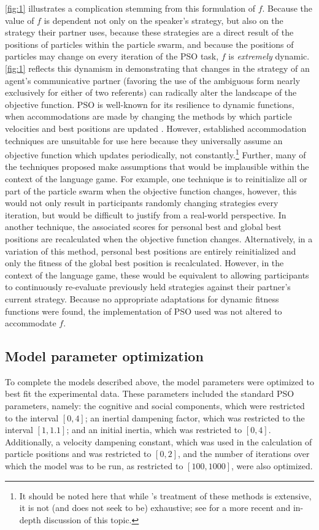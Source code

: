 \documentclass[12pt,a4paper]{article}
\begin{document}
\autoref{fig:1} illustrates a complication stemming from this formulation of $f$. Because the value of $f$ is dependent not only on the speaker's strategy, but also on the strategy their partner uses, because these strategies are a direct result of the positions of particles within the particle swarm, and because the positions of particles may change on every iteration of the PSO task, $f$ is \textit{extremely} dynamic. \autoref{fig:1} reflects this dynamism in demonstrating that changes in the strategy of an agent's communicative partner (favoring the use of the ambiguous form nearly exclusively for either of two referents) can radically alter the landscape of the objective function. PSO is well-known for its resilience to dynamic functions, when accommodations are made by changing the methods by which particle velocities and best positions are updated \citep{engelbrecht2005}. However, established accommodation techniques \citep{engelbrecht2005} are unsuitable for use here because they universally assume an objective function which updates periodically, not constantly.\footnote{It should be noted here that while \citeauthor{engelbrecht2005}'s treatment of these methods is extensive, it is not (and does not seek to be) exhaustive; see \cite{blackwell2007} for a more recent and in-depth discussion of this topic.} Further, many of the techniques proposed make assumptions that would be implausible within the context of the \citeauthor{rohde2012} language game. For example, one technique is to reinitialize all or part of the particle swarm when the objective function changes, however, this would not only result in participants randomly changing strategies every iteration, but would be difficult to justify from a real-world perspective. In another technique, the associated scores for personal best and global best positions are recalculated when the objective function changes. Alternatively, in a variation of this method, personal best positions are entirely reinitialized and only the fitness of the global best position is recalculated. However, in the context of the language game, these would be equivalent to allowing participants to continuously re-evaluate previously held strategies against their partner's current strategy. Because no appropriate adaptations for dynamic fitness functions were found, the implementation of PSO used was not altered to accommodate $f$.

\subsection{Model parameter optimization}
\label{sec:param_opt}
To complete the models described above, the model parameters were optimized to best fit the experimental data. These parameters included the standard PSO parameters, namely: the cognitive and social components, which were restricted to the interval $[0,4]$; an inertial dampening factor, which was restricted to the interval $[1,1.1]$; and an initial inertia, which was restricted to $[0,4]$. Additionally, a velocity dampening constant, which was used in the calculation of particle positions and was restricted to $[0,2]$, and the number of iterations over which the model was to be run, as restricted to $[100,1000]$, were also optimized.
\end{document}
